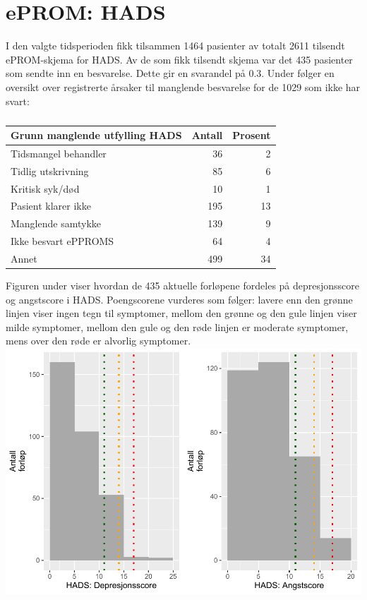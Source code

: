 \documentclass[
]{article}
\begin{document}
\hypertarget{eprom-hads}{%
\section{ePROM: HADS}\label{eprom-hads}}

I den valgte tidsperioden fikk tilsammen 1464 pasienter av totalt 2611
tilsendt ePROM-skjema for HADS. Av de som fikk tilsendt skjema var det
435 pasienter som sendte inn en besvarelse. Dette gir en svarandel på
0.3. Under følger en oversikt over registrerte årsaker til manglende
besvarelse for de 1029 som ikke har svart:

\begin{table}

\caption{\label{tab:hads}}
\centering
\begin{tabular}[t]{l|r|r}
\hline
Grunn manglende utfylling HADS & Antall  & Prosent\\
\hline
Tidsmangel behandler & 36 & 2\\
\hline
Tidlig utskrivning & 85 & 6\\
\hline
Kritisk syk/død & 10 & 1\\
\hline
Pasient klarer ikke & 195 & 13\\
\hline
Manglende samtykke & 139 & 9\\
\hline
Ikke besvart ePPROMS & 64 & 4\\
\hline
Annet & 499 & 34\\
\hline
\end{tabular}
\end{table}

Figuren under viser hvordan de 435 aktuelle forløpene fordeles på
depresjonsscore og angstscore i HADS. Poengscorene vurderes som følger:
lavere enn den grønne linjen viser ingen tegn til symptomer, mellom den
grønne og den gule linjen viser milde symptomer, mellom den gule og den
røde linjen er moderate symptomer, mens over den røde er alvorlig
symptomer.\includegraphics{LokalEprom_files/figure-latex/hads-1.pdf}
\end{document}
